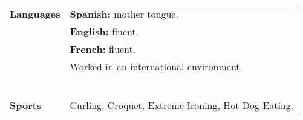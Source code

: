 \documentclass[twoside,a4paper,openright,10pt]{report}
\begin{document}
\begin{table}[ht]
\begin{tabular}{p{40mm} p{140mm}}
\textbf{Languages} & \textbf{Spanish:} mother tongue.\\
& \textbf{English:} fluent.\\
& \textbf{French:} fluent.\\
& Worked in an international environment.

\\
\multicolumn{2}{c}{\cellcolor{black} \textcolor{white}{Interests and Activities}}\\ \\

\textbf{Sports} & Curling, Croquet, Extreme Ironing, Hot Dog Eating.\\

\end{tabular}
\end{table}
\end{document}
